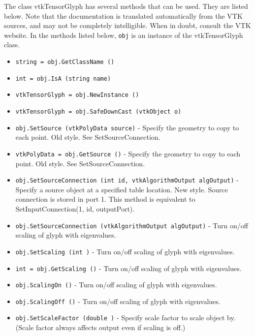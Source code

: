 The class vtkTensorGlyph has several methods that can be used.
  They are listed below.
Note that the documentation is translated automatically from the VTK sources,
and may not be completely intelligible.  When in doubt, consult the VTK website.
In the methods listed below, \verb|obj| is an instance of the vtkTensorGlyph class.
\begin{itemize}
\item  \verb|string = obj.GetClassName ()|

\item  \verb|int = obj.IsA (string name)|

\item  \verb|vtkTensorGlyph = obj.NewInstance ()|

\item  \verb|vtkTensorGlyph = obj.SafeDownCast (vtkObject o)|

\item  \verb|obj.SetSource (vtkPolyData source)| -  Specify the geometry to copy to each point. Old style. See
 SetSourceConnection.

\item  \verb|vtkPolyData = obj.GetSource ()| -  Specify the geometry to copy to each point. Old style. See
 SetSourceConnection.

\item  \verb|obj.SetSourceConnection (int id, vtkAlgorithmOutput algOutput)| -  Specify a source object at a specified table location. New style.
 Source connection is stored in port 1. This method is equivalent
 to SetInputConnection(1, id, outputPort).

\item  \verb|obj.SetSourceConnection (vtkAlgorithmOutput algOutput)| -  Turn on/off scaling of glyph with eigenvalues.

\item  \verb|obj.SetScaling (int )| -  Turn on/off scaling of glyph with eigenvalues.

\item  \verb|int = obj.GetScaling ()| -  Turn on/off scaling of glyph with eigenvalues.

\item  \verb|obj.ScalingOn ()| -  Turn on/off scaling of glyph with eigenvalues.

\item  \verb|obj.ScalingOff ()| -  Turn on/off scaling of glyph with eigenvalues.

\item  \verb|obj.SetScaleFactor (double )| -  Specify scale factor to scale object by. (Scale factor always affects
 output even if scaling is off.)


\end{itemize}
